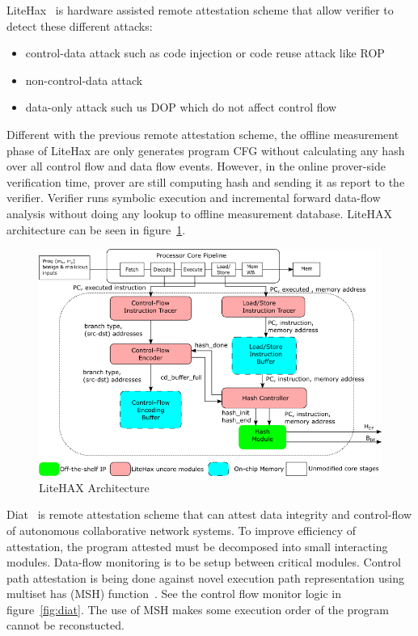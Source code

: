 LiteHax~\cite{dessoukyLiteHAXLightweightHardwareassisted2018} is hardware
assisted remote attestation scheme that allow verifier to detect these different
attacks:

\begin{itemize}
    \item control-data attack such as code injection or code reuse attack like ROP
    \item non-control-data attack
    \item data-only attack such us DOP which do not affect control flow
\end{itemize}

Different with the previous remote attestation scheme, the offline measurement
phase of LiteHax are only generates program CFG without calculating any hash
over all control flow and data flow events. However, in the online prover-side
verification time, prover are still computing hash and sending it as report to
the verifier. Verifier runs symbolic execution and incremental forward data-flow
analysis without doing any lookup to offline measurement database. LiteHAX
architecture can be seen in figure~\ref{fig:litehax}.

\begin{figure}[htbp]
\centerline{\includegraphics[scale=0.75]{Figures/01/litehax-overview.png}}
\caption{LiteHAX Architecture}
\label{fig:litehax}
\end{figure}

Diat~\cite{aberaDIATDataIntegrity2019} is remote attestation scheme that can
attest data integrity and control-flow of autonomous collaborative network
systems. To improve efficiency of attestation, the program attested must be
decomposed into small interacting modules. Data-flow monitoring is to be setup
between critical modules. Control path attestation is being done against novel
execution path representation using multiset has (MSH)
function~\cite{clarkeIncrementalMultisetHash2003}. See the control flow monitor
logic in figure~\ref{fig:diat}. The use of MSH makes some execution order of the
program cannot be reconstucted.

